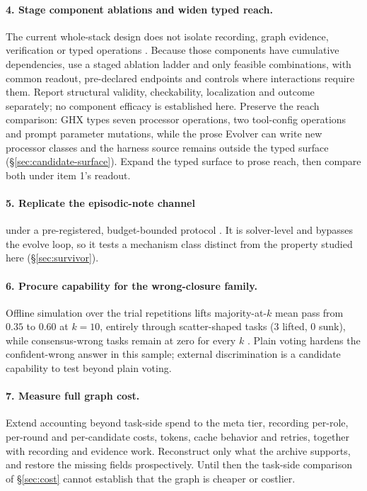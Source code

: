 \paragraph{4. Stage component ablations and widen typed reach.} The current
whole-stack design does not isolate recording, graph evidence, verification
or typed operations . Because those components have cumulative
dependencies, use a staged ablation ladder and only feasible combinations,
with common readout, pre-declared endpoints and controls where interactions
require them. Report structural validity, checkability, localization and
outcome separately; no component efficacy is established here. Preserve the
reach comparison: GHX types seven processor operations, two tool-config
operations and prompt parameter mutations, while the prose Evolver can write
new processor classes and the harness source remains outside the typed
surface (\S\ref{sec:candidate-surface}). Expand the typed surface to prose
reach, then compare both under item 1's readout.

\paragraph{5. Replicate the episodic-note channel} under a pre-registered,
budget-bounded protocol . It is solver-level and bypasses the evolve
loop, so it tests a mechanism class distinct from the property studied here
(\S\ref{sec:survivor}).

\paragraph{6. Procure capability for the wrong-closure family.} Offline
simulation over the trial repetitions lifts majority-at-$k$ mean pass from
$0.35$ to $0.60$ at $k{=}10$, entirely through scatter-shaped tasks (3
lifted, 0 sunk), while consensus-wrong tasks remain at zero for every $k$
. Plain voting hardens the confident-wrong answer in this sample;
external discrimination is a candidate capability to test beyond plain
voting.

\paragraph{7. Measure full graph cost.} Extend accounting beyond task-side
spend to the meta tier, recording per-role, per-round and per-candidate
costs, tokens, cache behavior and retries, together with recording and
evidence work. Reconstruct only what the archive supports, and restore the
missing fields prospectively. Until then the task-side comparison of
\S\ref{sec:cost} cannot establish that the graph is cheaper or costlier.



